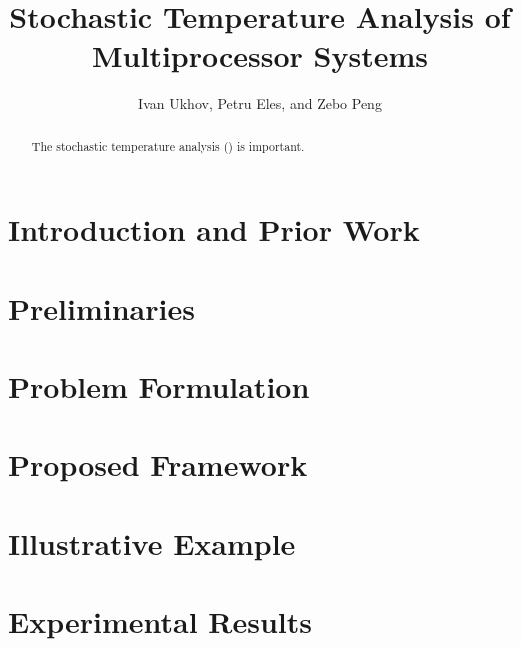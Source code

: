 \documentclass[conference]{IEEEtran}
\begin{document}
  \title{Stochastic Temperature Analysis of\\Multiprocessor Systems}
  \author{Ivan Ukhov, Petru Eles, and Zebo Peng}

  \author{
    \and
    \and
  }

  \maketitle

  \begin{abstract}
    The stochastic temperature analysis (\sta) is important.
  \end{abstract}

  \section{Introduction and Prior Work} 
  

  \section{Preliminaries}
  

  \section{Problem Formulation}
  

  \section{Proposed Framework}
  

  \section{Illustrative Example} 
  

  \section{Experimental Results} 
  

  
  
\end{document}
